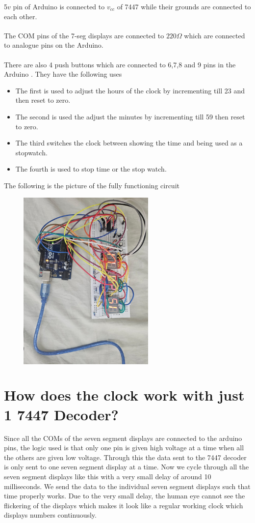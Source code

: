 \documentclass[a4paper,12pt]{article}
\begin{document}
5$v$ pin of Arduino is connected to $v_{cc}$ of 7447 while their grounds are connected to each other.\\
\\
The COM pins of the 7-seg displays are connected to $220 \Omega$ which are connected to analogue pins on the Arduino.\\
\\
There are also 4 push buttons which are connected to 6,7,8 and 9 pins in the Arduino . They have the following uses
\begin{itemize}
    \item The first is used to adjust the hours of the clock by incrementing till 23 and then reset to zero.
    \item The second is used the adjust the minutes by incrementing till 59 then reset to zero.
    \item The third switches the clock between showing the time and being used as a stopwatch.
    \item The fourth is used to stop time or the stop watch.
\end{itemize}
The following is the picture of the fully functioning circuit
\begin{figure}[h!] %
  \centering
  \includegraphics[width=0.6\textwidth]{figs/circuit.png}
\end{figure}

\section{How does the clock work with just 1 7447 Decoder?}
Since all the COMs of the seven segment displays are connected to the arduino pins, the logic used is that only one pin is given high voltage at a time when all the others are given low voltage. Through this the data sent to the 7447 decoder is only sent to one seven segment display at a time. Now we cycle through all the seven segment displays like this with a very small delay of around 10 milliseconds. We send the data to the individual seven segment displays such that time properly works. Due to the very small delay, the human eye cannot see the flickering of the displays which makes it look like a regular working clock which displays numbers continuously.
\end{document}
